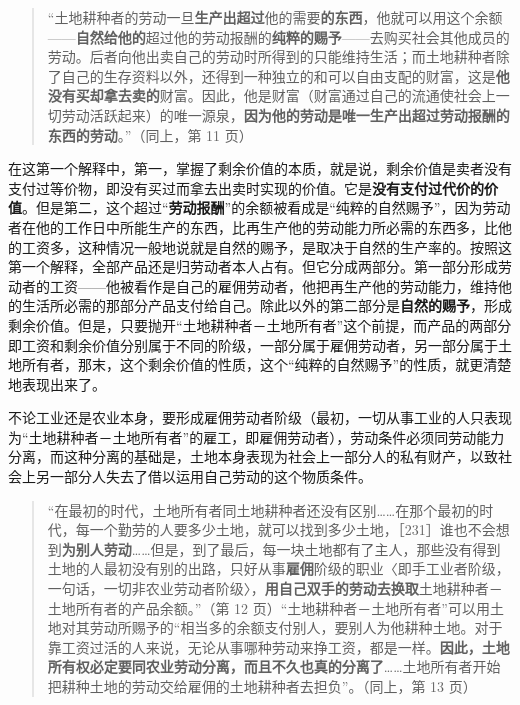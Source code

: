 \begin{quote}“土地耕种者的劳动一旦\textbf{生产出超过}他的需要\textbf{的东西}，他就可以用这个余额——\textbf{自然给他的}超过他的劳动报酬的\textbf{纯粹的赐予}——去购买社会其他成员的劳动。后者向他出卖自己的劳动时所得到的只能维持生活；而土地耕种者除了自己的生存资料以外，还得到一种独立的和可以自由支配的财富，这是\textbf{他没有买却拿去卖的}财富。因此，他是财富（财富通过自己的流通使社会上一切劳动活跃起来）的唯一源泉，\textbf{因为他的劳动是唯一生产出超过劳动报酬的东西的劳动}。”（同上，第 11 页）\end{quote}

在这第一个解释中，第一，掌握了剩余价值的本质，就是说，剩余价值是卖者没有支付过等价物，即没有买过而拿去出卖时实现的价值。它是\textbf{没有支付过代价的价值}。但是第二，这个超过“\textbf{劳动报酬}”的余额被看成是“纯粹的自然赐予”，因为劳动者在他的工作日中所能生产的东西，比再生产他的劳动能力所必需的东西多，比他的工资多，这种情况一般地说就是自然的赐予，是取决于自然的生产率的。按照这第一个解释，全部产品还是归劳动者本人占有。但它分成两部分。第一部分形成劳动者的工资——他被看作是自己的雇佣劳动者，他把再生产他的劳动能力，维持他的生活所必需的那部分产品支付给自己。除此以外的第二部分是\textbf{自然的赐予}，形成剩余价值。但是，只要抛开“土地耕种者－土地所有者”这个前提，而产品的两部分即工资和剩余价值分别属于不同的阶级，一部分属于雇佣劳动者，另一部分属于土地所有者，那末，这个剩余价值的性质，这个“纯粹的自然赐予”的性质，就更清楚地表现出来了。

不论工业还是农业本身，要形成雇佣劳动者阶级（最初，一切从事工业的人只表现为“土地耕种者－土地所有者”的雇工，即雇佣劳动者），劳动条件必须同劳动能力分离，而这种分离的基础是，土地本身表现为社会上一部分人的私有财产，以致社会上另一部分人失去了借以运用自己劳动的这个物质条件。

\begin{quote}“在最初的时代，土地所有者同土地耕种者还没有区别……在那个最初的时代，每一个勤劳的人要多少土地，就可以找到多少土地，［231］谁也不会想到\textbf{为别人劳动}……但是，到了最后，每一块土地都有了主人，那些没有得到土地的人最初没有别的出路，只好从事\textbf{雇佣}阶级的职业〈即手工业者阶级，一句话，一切非农业劳动者阶级〉，\textbf{用自己双手的劳动去换取}土地耕种者－土地所有者的产品余额。”（第 12 页）“土地耕种者－土地所有者”可以用土地对其劳动所赐予的“相当多的余额支付别人，要别人为他耕种土地。对于靠工资过活的人来说，无论从事哪种劳动来挣工资，都是一样。\textbf{因此，土地所有权必定要同农业劳动分离，而且不久也真的分离了}……土地所有者开始把耕种土地的劳动交给雇佣的土地耕种者去担负”。（同上，第 13 页）\end{quote}

